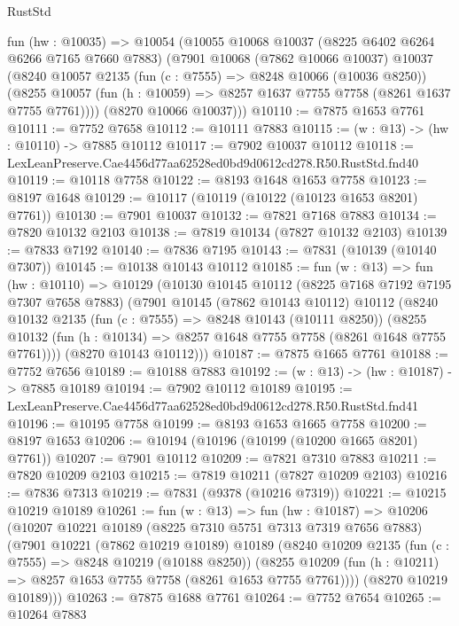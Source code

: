 \begin{lexlean}{RustStd}
\begin{coremodule}
  fun (hw : @10035) =>
  @10054
    (@10055
      @10068
      @10037
      (@8225 @6402 @6264 @6266 @7165 @7660 @7883)
      (@7901
        @10068
        (@7862 @10066 @10037)
        @10037
        (@8240
          @10057
          @2135
          (fun (c : @7555) => @8248 @10066 (@10036 @8250))
          (@8255 @10057 (fun (h : @10059) => @8257 @1637 @7755 @7758 (@8261 @1637 @7755 @7761))))
        (@8270 @10066 @10037)))
@10110 := @7875 @1653 @7761
@10111 := @7752 @7658
@10112 := @10111 @7883
@10115 := (w : @13) -> (hw : @10110) -> @7885 @10112
@10117 := @7902 @10037 @10112
@10118 := LexLeanPreserve.Cae4456d77aa62528ed0bd9d0612cd278.R50.RustStd.fnd40
@10119 := @10118 @7758
@10122 := @8193 @1648 @1653 @7758
@10123 := @8197 @1648
@10129 := @10117 (@10119 (@10122 (@10123 @1653 @8201) @7761))
@10130 := @7901 @10037
@10132 := @7821 @7168 @7883
@10134 := @7820 @10132 @2103
@10138 := @7819 @10134 (@7827 @10132 @2103)
@10139 := @7833 @7192
@10140 := @7836 @7195
@10143 := @7831 (@10139 (@10140 @7307))
@10145 := @10138 @10143 @10112
@10185 := fun (w : @13) =>
  fun (hw : @10110) =>
  @10129
    (@10130
      @10145
      @10112
      (@8225 @7168 @7192 @7195 @7307 @7658 @7883)
      (@7901
        @10145
        (@7862 @10143 @10112)
        @10112
        (@8240
          @10132
          @2135
          (fun (c : @7555) => @8248 @10143 (@10111 @8250))
          (@8255 @10132 (fun (h : @10134) => @8257 @1648 @7755 @7758 (@8261 @1648 @7755 @7761))))
        (@8270 @10143 @10112)))
@10187 := @7875 @1665 @7761
@10188 := @7752 @7656
@10189 := @10188 @7883
@10192 := (w : @13) -> (hw : @10187) -> @7885 @10189
@10194 := @7902 @10112 @10189
@10195 := LexLeanPreserve.Cae4456d77aa62528ed0bd9d0612cd278.R50.RustStd.fnd41
@10196 := @10195 @7758
@10199 := @8193 @1653 @1665 @7758
@10200 := @8197 @1653
@10206 := @10194 (@10196 (@10199 (@10200 @1665 @8201) @7761))
@10207 := @7901 @10112
@10209 := @7821 @7310 @7883
@10211 := @7820 @10209 @2103
@10215 := @7819 @10211 (@7827 @10209 @2103)
@10216 := @7836 @7313
@10219 := @7831 (@9378 (@10216 @7319))
@10221 := @10215 @10219 @10189
@10261 := fun (w : @13) =>
  fun (hw : @10187) =>
  @10206
    (@10207
      @10221
      @10189
      (@8225 @7310 @5751 @7313 @7319 @7656 @7883)
      (@7901
        @10221
        (@7862 @10219 @10189)
        @10189
        (@8240
          @10209
          @2135
          (fun (c : @7555) => @8248 @10219 (@10188 @8250))
          (@8255 @10209 (fun (h : @10211) => @8257 @1653 @7755 @7758 (@8261 @1653 @7755 @7761))))
        (@8270 @10219 @10189)))
@10263 := @7875 @1688 @7761
@10264 := @7752 @7654
@10265 := @10264 @7883

\end{coremodule}
\end{lexlean}
